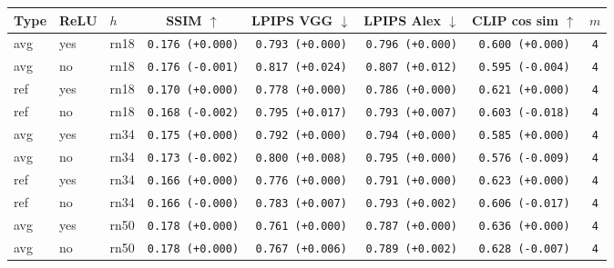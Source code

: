 \begin{tabular}{|l|l|l|c|c|c|c|c|}
\hline
Type & ReLU & $h$ & SSIM $\uparrow$ & LPIPS VGG $\downarrow$ & LPIPS Alex $\downarrow$ & CLIP cos sim $\uparrow$ & $m$ \\
\hline
\rowcolor{verylightgray}avg & yes & rn18 & \texttt{0.176 {\color{black}(+0.000)}} & \texttt{0.793 {\color{black}(+0.000)}} & \texttt{0.796 {\color{black}(+0.000)}} & \texttt{0.600 {\color{black}(+0.000)}} & \texttt{4} \\
avg & no & rn18 & \texttt{0.176 {\color{red}(-0.001)}} & \texttt{0.817 {\color{red}(+0.024)}} & \texttt{0.807 {\color{red}(+0.012)}} & \texttt{0.595 {\color{red}(-0.004)}} & \texttt{4} \\
\hline
\rowcolor{verylightgray}ref & yes & rn18 & \texttt{0.170 {\color{black}(+0.000)}} & \texttt{0.778 {\color{black}(+0.000)}} & \texttt{0.786 {\color{black}(+0.000)}} & \texttt{0.621 {\color{black}(+0.000)}} & \texttt{4} \\
ref & no & rn18 & \texttt{0.168 {\color{red}(-0.002)}} & \texttt{0.795 {\color{red}(+0.017)}} & \texttt{0.793 {\color{red}(+0.007)}} & \texttt{0.603 {\color{red}(-0.018)}} & \texttt{4} \\
\hline
\rowcolor{verylightgray}avg & yes & rn34 & \texttt{0.175 {\color{black}(+0.000)}} & \texttt{0.792 {\color{black}(+0.000)}} & \texttt{0.794 {\color{black}(+0.000)}} & \texttt{0.585 {\color{black}(+0.000)}} & \texttt{4} \\
avg & no & rn34 & \texttt{0.173 {\color{red}(-0.002)}} & \texttt{0.800 {\color{red}(+0.008)}} & \texttt{0.795 {\color{black}(+0.000)}} & \texttt{0.576 {\color{red}(-0.009)}} & \texttt{4} \\
\hline
\rowcolor{verylightgray}ref & yes & rn34 & \texttt{0.166 {\color{black}(+0.000)}} & \texttt{0.776 {\color{black}(+0.000)}} & \texttt{0.791 {\color{black}(+0.000)}} & \texttt{0.623 {\color{black}(+0.000)}} & \texttt{4} \\
ref & no & rn34 & \texttt{0.166 {\color{black}(-0.000)}} & \texttt{0.783 {\color{red}(+0.007)}} & \texttt{0.793 {\color{red}(+0.002)}} & \texttt{0.606 {\color{red}(-0.017)}} & \texttt{4} \\
\hline
\rowcolor{verylightgray}avg & yes & rn50 & \texttt{0.178 {\color{black}(+0.000)}} & \texttt{0.761 {\color{black}(+0.000)}} & \texttt{0.787 {\color{black}(+0.000)}} & \texttt{0.636 {\color{black}(+0.000)}} & \texttt{4} \\
avg & no & rn50 & \texttt{0.178 {\color{black}(+0.000)}} & \texttt{0.767 {\color{red}(+0.006)}} & \texttt{0.789 {\color{red}(+0.002)}} & \texttt{0.628 {\color{red}(-0.007)}} & \texttt{4} \\

\end{tabular}
